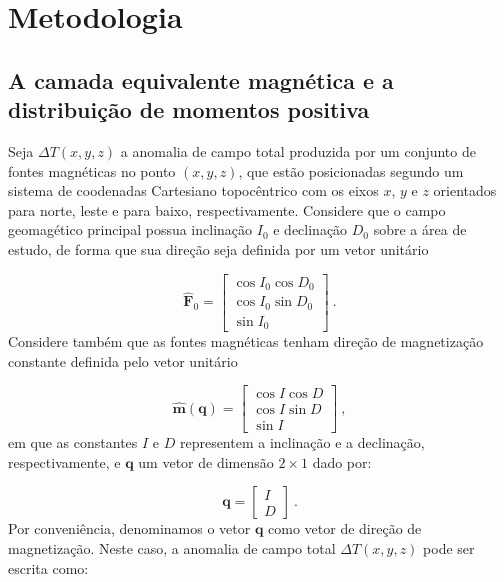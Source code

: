 \chapter{Metodologia}
\label{chap:metodologia}

\section{A camada equivalente magnética e a distribuição de momentos positiva}
\label{sec:mag_eqlayer}

Seja $\Delta T(x, y, z)$ a anomalia de campo total produzida por um conjunto de fontes magnéticas no ponto $(x,y,z)$, que estão posicionadas segundo um sistema de coodenadas Cartesiano topocêntrico com os eixos $x$, $y$ e $z$ orientados para norte, leste e para baixo, respectivamente. Considere que o campo geomagético principal possua inclinação $I_{0}$ e declinação $D_{0}$ sobre a área de estudo, de forma que sua direção seja definida por um vetor unitário  

\begin{equation}
\hat{\mathbf{F}}_{0} = \begin{bmatrix}
\cos I_{0} \cos D_{0} \\
\cos I_{0} \sin D_{0} \\
\sin I_{0}
\end{bmatrix} \: .
\label{eq:campo_principal}
\end{equation}
Considere também que as fontes magnéticas tenham direção de magnetização constante definida pelo vetor unitário 

\begin{equation}
\hat{\mathbf{m}}(\mathbf{q}) = \begin{bmatrix}
\cos {I} \cos {D} \\
\cos {I} \sin {D} \\
\sin {I}
\end{bmatrix} \: ,
\label{eq:mag_vet}
\end{equation}
em que as constantes $I$ e $D$ representem a inclinação e a declinação, respectivamente, e $\mathbf{q}$ um vetor de dimensão $2 \times 1$ dado por: 

\begin{equation}
\mathbf{q} = \begin{bmatrix}
I \\ 
D
\end{bmatrix} \: .
\label{eq:q_vetor}
\end{equation}
Por conveniência, denominamos o vetor $\mathbf{q}$ como vetor de direção de magnetização. Neste caso, a anomalia de campo total $\Delta T(x, y, z)$ pode ser escrita como: 

